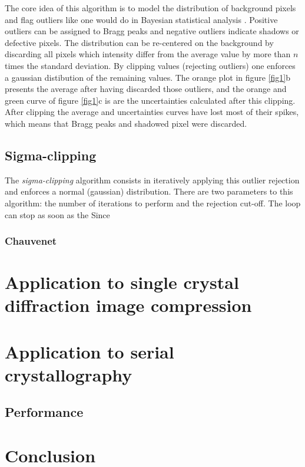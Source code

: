 \documentclass[preprint]{iucr}              %
\begin{document}
The core idea of this algorithm is to model the distribution of background pixels and flag outliers like one would do in Bayesian statistical analysis \cite{Sivia2006}. 
Positive outliers can be assigned to Bragg peaks and negative outliers indicate shadows or defective pixels. 
The distribution can be re-centered on the background by discarding all pixels which intensity differ from the average value by more than $n$ times the standard deviation.
By clipping values (rejecting outliers) one enforces a gaussian distibution of the remaining values.
The orange plot in figure \ref{fig1}b presents the average after having discarded those outliers, and the orange and green curve of figure \ref{fig1}c is are the uncertainties 
calculated after this clipping. 
 After clipping the average and uncertainties curves have lost most of their spikes, which means that Bragg peaks and shadowed pixel were discarded.
 
\subsection{Sigma-clipping}
The \textit{sigma-clipping} algorithm consists in iteratively applying this outlier rejection and enforces a normal (gaussian) distribution.
There are two parameters to this algorithm: the number of iterations to perform and the rejection cut-off.
The loop can stop as soon as the 
Since     

\subsubsection{Chauvenet}




\section{Application to single crystal diffraction image compression}

\section{Application to serial crystallography}

\subsection{Performance}
\section{Conclusion}
\end{document}
